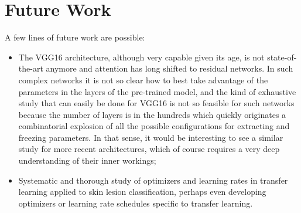 \section{Future Work}

A few lines of future work are possible:

\begin{itemize}
    \item The VGG16 architecture, although very capable given its age, is not state-of-the-art anymore and attention has long shifted to residual networks. In such complex networks it is not so clear how to best take advantage of the parameters in the layers of the pre-trained model, and the kind of exhaustive study that can easily be done for VGG16 is not so feasible for such networks because the number of layers is in the hundreds which quickly originates a combinatorial explosion of all the possible configurations for extracting and freezing parameters. In that sense, it would be interesting to see a similar study for more recent architectures, which of course requires a very deep understanding of their inner workings;
    \item Systematic and thorough study of optimizers and learning rates in transfer learning applied to skin lesion classification, perhaps even developing optimizers or learning rate schedules specific to transfer learning.
\end{itemize}
